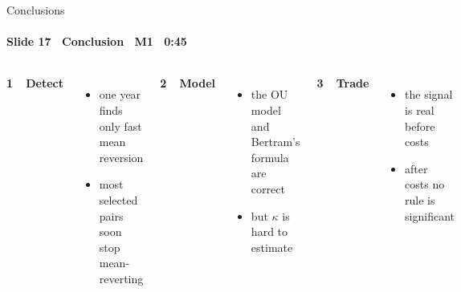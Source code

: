 \begin{frame}{Conclusions}
\framesubtitle{Slide 17 \textbullet\ Conclusion \textbullet\ M1 \textbullet\ 0:45}
\vspace{-2pt}
\normalsize
\begin{columns}[T,onlytextwidth]
  \textbf{\color{deckAccent}1\ \ Detect}
  \begin{itemize}\setlength{\itemsep}{2pt}
    \item one year finds only fast mean reversion
    \item most selected pairs soon stop mean-reverting
  \end{itemize}
  \textbf{\color{deckAccent}2\ \ Model}
  \begin{itemize}\setlength{\itemsep}{2pt}
    \item the OU model and Bertram's formula are correct
    \item but $\kappa$ is hard to estimate
  \end{itemize}
  \textbf{\color{deckAccent}3\ \ Trade}
  \begin{itemize}\setlength{\itemsep}{2pt}
    \item the signal is real before costs
    \item after costs no rule is significant
  \end{itemize}
\end{columns}
\end{frame}
